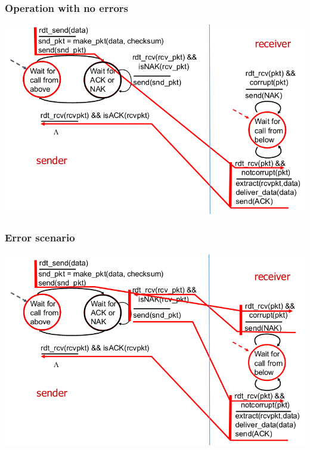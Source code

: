 \documentclass{article}[18pt]
\begin{document}
\subsubsection{Operation with no errors}
\begin{center}
	\includegraphics[scale=0.7]{operation_with_no_errors}
\end{center}
\subsubsection{Error scenario}
\begin{center}
	\includegraphics[scale=0.7]{error_scenario}
\end{center}
\end{document}
